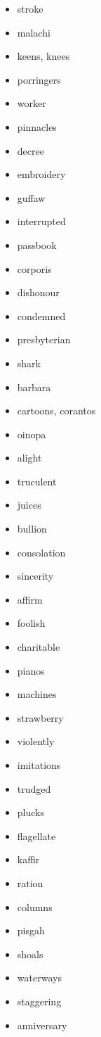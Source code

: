 \documentclass{article}
\begin{document}
\begin{itemize}
    \item stroke
    \item malachi
    \item keens, knees
    \item porringers
    \item worker
    \item pinnacles
    \item decree
    \item embroidery
    \item guffaw
    \item interrupted
    \item passbook
    \item corporis
    \item dishonour
    \item condemned
    \item presbyterian
    \item shark
    \item barbara
    \item cartoons, corantos
    \item oinopa
    \item alight
    \item truculent
    \item juices
    \item bullion
    \item consolation
    \item sincerity
    \item affirm
    \item foolish
    \item charitable
    \item pianos
    \item machines
    \item strawberry
    \item violently
    \item imitations
    \item trudged
    \item plucks
    \item flagellate
    \item kaffir
    \item ration
    \item columns
    \item pisgah
    \item shoals
    \item waterways
    \item staggering
    \item anniversary

\end{itemize}
\end{document}
